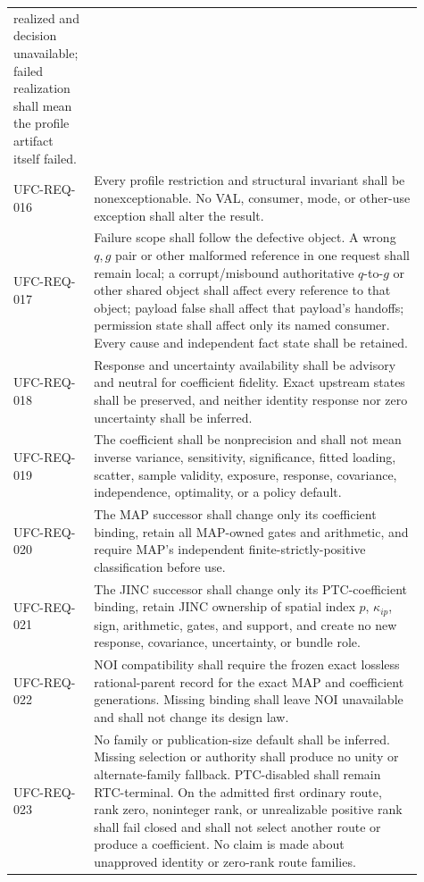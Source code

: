 \begin{longtable}{p{0.15\linewidth}p{0.76\linewidth}}
realized and decision unavailable; failed realization shall mean the profile
artifact itself failed.\\
UFC-REQ-016 & Every profile restriction and structural invariant shall be
nonexceptionable. No VAL, consumer, mode, or other-use exception shall alter
the result.\\
UFC-REQ-017 & Failure scope shall follow the defective object. A wrong
\(q,g\) pair or other malformed reference in one request shall remain local;
a corrupt/misbound authoritative \(q\)-to-\(g\) or other shared object shall
affect every reference to that object; payload false shall affect that
payload's handoffs; permission state shall affect only its named consumer.
Every cause and independent fact state shall be retained.\\
UFC-REQ-018 & Response and uncertainty availability shall be advisory and
neutral for coefficient fidelity. Exact upstream states shall be preserved,
and neither identity response nor zero uncertainty shall be inferred.\\
UFC-REQ-019 & The coefficient shall be nonprecision and shall not mean inverse
variance, sensitivity, significance, fitted loading, scatter, sample validity,
exposure, response, covariance, independence, optimality, or a policy
default.\\
UFC-REQ-020 & The MAP successor shall change only its coefficient binding,
retain all MAP-owned gates and arithmetic, and require MAP's independent
finite-strictly-positive classification before use.\\
UFC-REQ-021 & The JINC successor shall change only its PTC-coefficient binding,
retain JINC ownership of spatial index \(p\), \(\kappa_{ip}\), sign,
arithmetic, gates, and support, and create no new response, covariance,
uncertainty, or bundle role.\\
UFC-REQ-022 & NOI compatibility shall require the frozen exact lossless
rational-parent record for the exact MAP and coefficient generations. Missing
binding shall leave NOI unavailable and shall not change its design law.\\
UFC-REQ-023 & No family or publication-size default shall be inferred. Missing
selection or authority shall produce no unity or alternate-family fallback.
PTC-disabled shall remain RTC-terminal. On the admitted first ordinary route,
rank zero, noninteger rank, or unrealizable positive rank shall fail closed and
shall not select another route or produce a coefficient. No claim is made
about unapproved identity or zero-rank route families.\\

\end{longtable}
